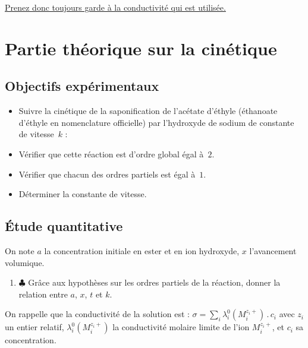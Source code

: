 \documentclass{tp}
\begin{document}
\indent \underline{Prenez donc toujours garde à la conductivité qui est utilisée.}\\

\vspace{-0.4cm}

\section{Partie théorique sur la cinétique}

\subsection{Objectifs expérimentaux}

\begin{itemize}
\item Suivre la cinétique de la saponification de l'acétate d'éthyle (éthanoate d'éthyle en nomenclature officielle) par l'hydroxyde de sodium de constante de vitesse~$k$ :



\item Vérifier que cette réaction est d'ordre global égal à~$2$.
\item Vérifier que chacun des ordres partiels est égal à~$1$.
\item Déterminer la constante de vitesse.
\end{itemize}

\subsection{\'Etude quantitative}

\indent On note $a$ la concentration initiale en ester et en ion hydroxyde, $x$ l'avancement volumique.

\begin{enumerate}

\item $\clubsuit$ Grâce aux hypothèses sur les ordres partiels de la réaction, donner la relation entre $a$, $x$, $t$ et $k$.

\end{enumerate}

\indent On rappelle que la conductivité de la solution est : $\boxed{\sigma = \sum_i \lambda_i^0(M_i^{z_i +}) \, . \, c_i}$ avec $z_i$ un entier relatif, $\lambda_i^0(M_i^{z_i +})$ la conductivité molaire limite de l'ion $M_i^{z_i +}$, et $c_i$ sa concentration.
\end{document}
